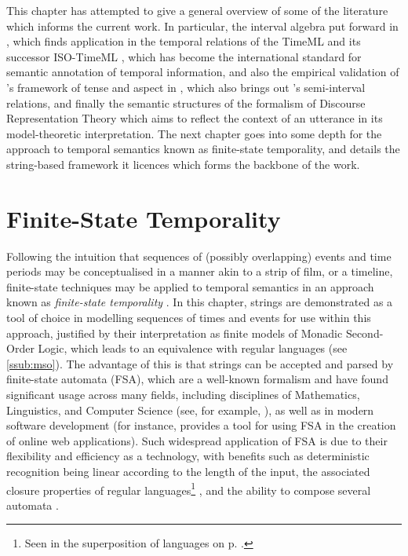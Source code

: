 \documentclass[a4paper,12pt,leqno,twoside]{article}
\begin{document}

This chapter has attempted to give a general overview of some of the literature which informs the current work. In particular, the interval algebra put forward in \citet{allen1983maintaining}, which finds application in the temporal relations of the TimeML \citep{timeml2005timeml} and its successor ISO-TimeML \citep{pustejovsky2010iso}, which has become the international standard for semantic annotation of temporal information, and also the empirical validation of \citet{reichenbach1947elements}'s framework of tense and aspect in \citet{Derczynski2013}, which also brings out \citet{Freksa1992}'s semi-interval relations, and finally the semantic structures of the formalism of Discourse Representation Theory \citep{kamp1981theory} which aims to reflect the context of an utterance in its model-theoretic interpretation. The next chapter goes into some depth for the approach to temporal semantics known as finite-state temporality, and details the string-based framework it licences which forms the backbone of the work.

\newpage
\section{Finite-State Temporality}\label{sec:fst}
Following the intuition that sequences of (possibly overlapping) events and time periods may be conceptualised in a manner akin to a strip of film, or a timeline, finite-state techniques may be applied to temporal semantics in an approach known as \textit{finite-state temporality} \citep{fernando2005entailments}. In this chapter, strings are demonstrated as a tool of choice in modelling sequences of times and events for use within this approach, justified by their interpretation as finite models of Monadic Second-Order Logic, which leads to an equivalence with regular languages (see \cref{ssub:mso}). The advantage of this is that strings can be accepted and parsed by finite-state automata (FSA), which are a well-known formalism and have found significant usage across many fields, including disciplines of Mathematics, Linguistics, and Computer Science (see, for example, \citet{buchner1993finite,veanes2012symbolic}), as well as in modern software development (for instance, \citet{khourshid_2015} provides a tool for using FSA in the creation of online web applications). Such widespread application of FSA is due to their flexibility and efficiency as a technology, with benefits such as deterministic recognition being linear according to the length of the input, the associated closure properties of regular languages\footnote{Seen in the superposition of languages on p. \pageref{def:lang-superposition}.}%
, and the ability to compose several automata \citep{wintner2007finite}.
\end{document}

